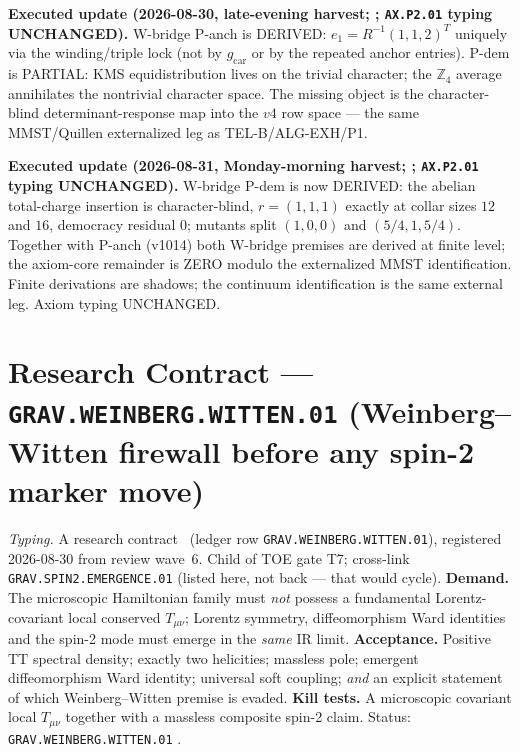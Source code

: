 \par\smallskip\noindent\textbf{Executed update (2026-08-30, late-evening harvest;
;
\texttt{AX.P2.01} typing UNCHANGED).}
W-bridge P-anch is DERIVED: $e_1=R^{-1}(1,1,2)^T$ uniquely via the winding/triple lock
(not by $g_{\mathrm{car}}$ or by the repeated anchor entries).  P-dem is PARTIAL: KMS
equidistribution lives on the trivial character; the $\mathbb Z_4$ average annihilates
the nontrivial character space.  The missing object is the character-blind
determinant-response map into the $v4$ row space --- the same MMST/Quillen externalized
leg as TEL-B/ALG-EXH/P1.

\par\smallskip\noindent\textbf{Executed update (2026-08-31, Monday-morning harvest;
;
\texttt{AX.P2.01} typing UNCHANGED).}
W-bridge P-dem is now DERIVED: the abelian total-charge insertion is character-blind,
$r=(1,1,1)$ exactly at collar sizes $12$ and $16$, democracy residual $0$; mutants split
$(1,0,0)$ and $(5/4,1,5/4)$.  Together with P-anch (v1014) both W-bridge premises are
derived at finite level; the axiom-core remainder is ZERO modulo the externalized MMST
identification.  Finite derivations are shadows; the continuum identification is the same
external leg.  Axiom typing UNCHANGED.

\section*{Research Contract --- \texttt{GRAV.WEINBERG.WITTEN.01} (Weinberg--Witten firewall before any spin-2 marker move)}
\noindent\emph{Typing.} A research contract \mO\ (ledger row
\texttt{GRAV.WEINBERG.WITTEN.01}), registered 2026-08-30 from review wave~6.
Child of TOE gate T7; cross-link \texttt{GRAV.SPIN2.EMERGENCE.01} (listed here, not back ---
that would cycle).  \textbf{Demand.}  The microscopic Hamiltonian family must \emph{not}
possess a fundamental Lorentz-covariant local conserved $T_{\mu\nu}$; Lorentz symmetry,
diffeomorphism Ward identities and the spin-2 mode must emerge in the \emph{same} IR limit.
\textbf{Acceptance.}  Positive TT spectral density; exactly two helicities; massless pole;
emergent diffeomorphism Ward identity; universal soft coupling; \emph{and} an explicit
statement of which Weinberg--Witten premise is evaded.  \textbf{Kill tests.}  A microscopic
covariant local $T_{\mu\nu}$ together with a massless composite spin-2 claim.
Status: \texttt{GRAV.WEINBERG.WITTEN.01} \mO.


